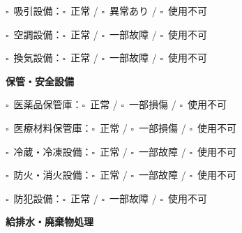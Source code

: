 \documentclass[a4paper,12pt]{jarticle}
\newcommand{\checkbox}{$\square$\ }
\begin{document}
\noindent
\checkbox 吸引設備：\quad \checkbox 正常 \quad / \quad \checkbox 異常あり \quad / \quad \checkbox 使用不可

\vspace{2mm}

\noindent
\checkbox 空調設備：\quad \checkbox 正常 \quad / \quad \checkbox 一部故障 \quad / \quad \checkbox 使用不可

\vspace{2mm}

\noindent
\checkbox 換気設備：\quad \checkbox 正常 \quad / \quad \checkbox 一部故障 \quad / \quad \checkbox 使用不可

\vspace{8mm}

\begin{center}
\textbf{\large 保管・安全設備}
\end{center}

\vspace{3mm}

\noindent
\checkbox 医薬品保管庫：\quad \checkbox 正常 \quad / \quad \checkbox 一部損傷 \quad / \quad \checkbox 使用不可

\vspace{2mm}

\noindent
\checkbox 医療材料保管庫：\quad \checkbox 正常 \quad / \quad \checkbox 一部損傷 \quad / \quad \checkbox 使用不可

\vspace{2mm}

\noindent
\checkbox 冷蔵・冷凍設備：\quad \checkbox 正常 \quad / \quad \checkbox 一部故障 \quad / \quad \checkbox 使用不可

\vspace{2mm}

\noindent
\checkbox 防火・消火設備：\quad \checkbox 正常 \quad / \quad \checkbox 一部故障 \quad / \quad \checkbox 使用不可

\vspace{2mm}

\noindent
\checkbox 防犯設備：\quad \checkbox 正常 \quad / \quad \checkbox 一部故障 \quad / \quad \checkbox 使用不可

\vspace{8mm}

\begin{center}
\textbf{\large 給排水・廃棄物処理}
\end{center}

\vspace{3mm}
\end{document}
